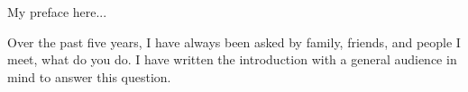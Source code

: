 

My preface here...

Over the past five years, I have always been asked by family, friends, 
and people I meet, what do you do.
I have written the introduction with a general audience in mind to answer this
question.
